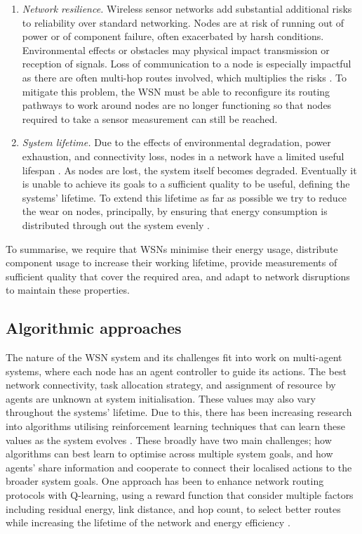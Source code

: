 \begin{enumerate}
\item \label{requirement:resilience} \textit{Network resilience.} Wireless sensor networks add substantial additional risks to reliability over standard networking. Nodes are at risk of running out of power or of component failure, often exacerbated by harsh conditions. Environmental effects or obstacles may physical impact transmission or reception of signals. Loss of communication to a node is especially impactful as there are often multi-hop routes involved, which multiplies the risks \citep{Paradis2007}. To mitigate this problem, the WSN must be able to reconfigure its routing pathways to work around nodes are no longer functioning so that nodes required to take a sensor measurement can still be reached.

\item \label{requirement:lifetime} \textit{System lifetime.} Due to the effects of environmental degradation, power exhaustion, and connectivity loss, nodes in a network have a limited useful lifespan \citep{Mak2009}. As nodes are lost, the system itself becomes degraded. Eventually it is unable to achieve its goals to a sufficient quality to be useful, defining the systems' lifetime. To extend this lifetime as far as possible we try to reduce the wear on nodes, principally, by ensuring that energy consumption is distributed through out the system evenly \citep{BABAYO20171176, Engmann2018}.
\end{enumerate}
To summarise, we require that WSNs minimise their energy usage, distribute component usage to increase their working lifetime, provide measurements of sufficient quality that cover the required area, and adapt to network disruptions to maintain these properties.

\subsection{Algorithmic approaches}
The nature of the WSN system and its challenges fit into work on multi-agent systems, where each node has an agent controller to guide its actions. The best network connectivity, task allocation strategy, and assignment of resource by agents are unknown at system initialisation. These values may also vary throughout the systems' lifetime. Due to this, there has been increasing research into algorithms utilising reinforcement learning techniques that can learn these values as the system evolves \citep{Al-Rawi2015}. These broadly have two main challenges; how algorithms can best learn to optimise across multiple system goals, and how agents' share information and cooperate to connect their localised actions to the broader system goals. One approach has been to enhance network routing protocols with Q-learning, using a reward function that consider multiple factors including residual energy, link distance, and hop count, to select better routes while increasing the lifetime of the network and energy efficiency \citep{Guo2019}. 

